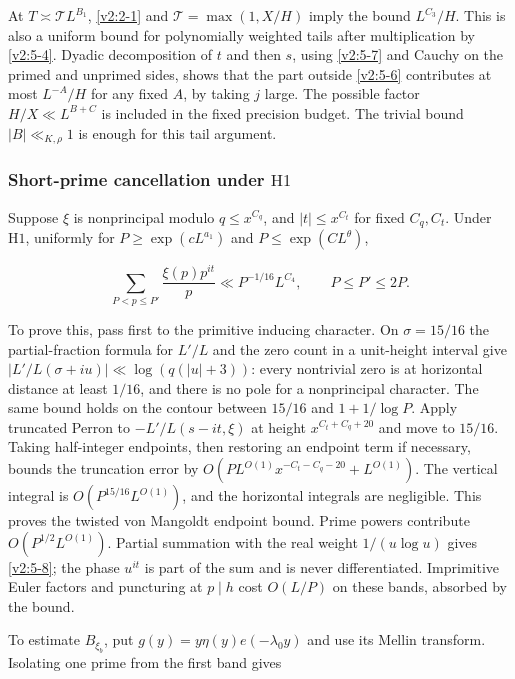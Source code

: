 \documentclass[11pt]{article}
\theoremstyle{definition}
\theoremstyle{remark}
\numberwithin{equation}{section}
\begin{document}
At $T\asymp\mathcal T L^{B_1}$, \eqref{v2:2-1} and $\mathcal T=\max(1,X/H)$ imply the bound $L^{C_3}/H$. This is also a uniform bound for polynomially weighted tails after multiplication by \eqref{v2:5-4}. Dyadic decomposition of $t$ and then $s$, using \eqref{v2:5-7} and Cauchy on the primed and unprimed sides, shows that the part outside \eqref{v2:5-6} contributes at most $L^{-A}/H$ for any fixed $A$, by taking $j$ large. The possible factor $H/X\ll L^{B+C}$ is included in the fixed precision budget. The trivial bound $|B|\ll_{K,\rho}1$ is enough for this tail argument.

\subsubsection{Short-prime cancellation under \texorpdfstring{$\mathrm H1$}{H1}}\label{subsec:short-prime}
Suppose $\xi$ is nonprincipal modulo $q\le x^{C_q}$, and $|t|\le x^{C_t}$ for fixed $C_q,C_t$. Under $\mathrm H1$, uniformly for $P\ge\exp(cL^{a_1})$ and $P\le\exp(CL^\theta)$,


\begin{equation}\label{v2:5-8}
\sum_{P<p\le P'}\frac{\xi(p)p^{it}}p\ll P^{-1/16}L^{C_4},\qquad P\le P'\le2P.
\end{equation}


To prove this, pass first to the primitive inducing character. On $\sigma=15/16$ the partial-fraction formula for $L'/L$ and the zero count in a unit-height interval give $|L'/L(\sigma+iu)|\ll\log(q(|u|+3))$: every nontrivial zero is at horizontal distance at least $1/16$, and there is no pole for a nonprincipal character. The same bound holds on the contour between $15/16$ and $1+1/\log P$. Apply truncated Perron to $-L'/L(s-it,\xi)$ at height $x^{C_t+C_q+20}$ and move to $15/16$. Taking half-integer endpoints, then restoring an endpoint term if necessary, bounds the truncation error by $O(PL^{O(1)}x^{-C_t-C_q-20}+L^{O(1)})$. The vertical integral is $O(P^{15/16}L^{O(1)})$, and the horizontal integrals are negligible. This proves the twisted von Mangoldt endpoint bound. Prime powers contribute $O(P^{1/2}L^{O(1)})$. Partial summation with the real weight $1/(u\log u)$ gives \eqref{v2:5-8}; the phase $u^{it}$ is part of the sum and is never differentiated. Imprimitive Euler factors and puncturing at $p\mid h$ cost $O(L/P)$ on these bands, absorbed by the bound.

To estimate $B_{\xi_b}$, put $g(y)=y\eta(y)e(-\lambda_0y)$ and use its Mellin transform. Isolating one prime from the first band gives
\end{document}
